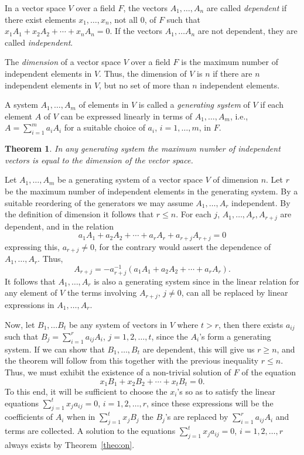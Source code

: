 \documentclass[11pt]{article}
\newtheorem{theo}{Theorem}
\theoremstyle{definition}
\begin{document}
In a vector space $V$ over a field $F$, the vectors $A_1, \ldots, A_n$ are called \emph{dependent} if there exist elements $x_1, \ldots, x_n$, not all $0$, of $F$ such that $x_1 A_1 + x_2 A_2 + \cdots + x_n A_n = 0$.
If the vectors $A_1, \ldots A_n$ are not dependent, they are called \emph{independent}.

The \emph{dimension} of a vector space $V$ over a field $F$ is the maximum number of independent elements in $V$. Thus, the dimension of $V$ is $n$ if there are $n$ independent elements in $V$, but no set of more than $n$ independent elements.

A system $A_1, \ldots, A_m$ of elements in $V$ is called a \emph{generating system} of $V$ if each element $A$ of $V$ can be expressed linearly in terms of $A_1, \ldots, A_m$, i.e., $A = \sum_{i = 1}^m a_i A_i$ for a suitable choice of $a_i$, $i = 1,\ldots, m$, in $F$.


\begin{theo}
\label{theo:tw}
In any generating system the maximum number of independent vectors is equal to the dimension of the vector space.
\end{theo}

Let $A_1, \ldots, A_m$ be a generating system of a vector space $V$ of dimension $n$.
Let $r$ be the maximum number of independent elements in the generating system.
By a suitable reordering of the generators we may assume $A_1, \dots, A_r$ independent.
By the definition of dimension it follows that $r \leq n$.
For each $j$, $A_1, \ldots, A_r, A_{r+j}$ are dependent, and in the relation
\[
a_1 A_1 + a_2 A_2 + \cdots + a_r A_r + a_{r+j} A_{r+j} = 0
\]
expressing this, $a_{r+j} \not=0$, for the contrary would assert the dependence of $A_1, \ldots, A_r$.
Thus,
\[
A_{r+j} = -a_{r+j}^{-1}(a_1 A_1 + a_2 A_2 + \cdots + a_r A_r).
\]
It follows that $A_1, \ldots, A_r$ is also a generating system since in the linear relation for any element of $V$ the terms involving $A_{r+j}$, $j\not=0$, can all be replaced by linear expressions in $A_1, \ldots, A_r$.

Now, let $B_1, \ldots B_t$ be any system of vectors in $V$ where $t > r$, then there exists $a_{ij}$ such that $B_j = \sum_{i=1}^r a_{ij} A_i$, $j=1,2,\dots,t$, since the $A_i$'s form a generating system.
If we can show that $B_1, \ldots, B_t$ are dependent, this will give us $r \geq n$, and the theorem will follow from this together with the previous inequality $r \leq n$.
Thus, we must exhibit the existence of a non-trivial solution of $F$ of the equation
\[
x_1 B_1 + x_2 B_2 + \cdots + x_t B_t = 0.
\]
To this end, it will be sufficient to choose the $x_i$'s so as to satisfy the linear equations $\sum_{j=1}^t x_j a_{ij} = 0$, $i = 1,2,\dots,r$, since these expressions will be the coefficients of $A_i$ when in $\sum_{j=1}^t x_j B_j$ the $B_j$'s are replaced by $\sum_{i=1}^r a_{ij} A_i$ and terms are collected.
A solution to the equations $\sum_{j=1}^t x_j a_{ij} = 0$, $i = 1,2,\ldots,r$ always exists by Theorem~\ref{theo:on}.
\end{document}

